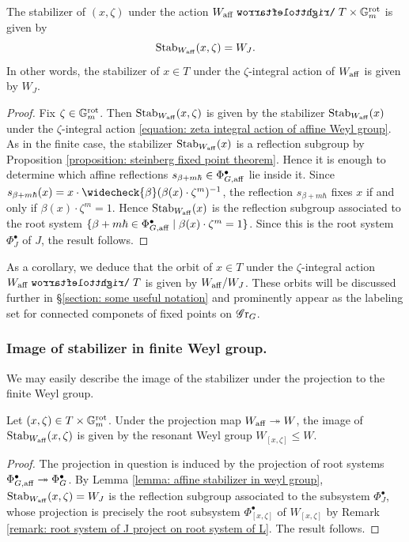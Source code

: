 \begin{lemma}\label{lemma: affine stabilizer in weyl group}
The stabilizer of $(x, \zeta)$ under the action $W_{\aff} \acts T \times \Gm^{\rot}$ is given by
\begin{equation*}
    \operatorname{Stab}_{W_{\mathrm{aff}}}(x, \zeta) = W_J.
\end{equation*}
In other words, the stabilizer of $x \in T$ under the $\zeta$-integral action of $W_{\mathrm{aff}}$ is given by $W_J$.
\end{lemma}
\begin{proof}
Fix $\zeta \in \mathbb{G}_m^{\mathrm{rot}}$. Then $\operatorname{Stab}_{W_{\mathrm{aff}}}(x, \zeta)$ is given by the stabilizer $\operatorname{Stab}_{W_{\mathrm{aff}}}(x)$ under the $\zeta$-integral action \eqref{equation: zeta integral action of affine Weyl group}. 
As in the finite case, the stabilizer $\operatorname{Stab}_{W_{\mathrm{aff}}}(x)$ is a reflection subgroup by Proposition \ref{proposition: steinberg fixed point theorem}. 
%
Hence it is enough to determine which affine reflections $s_{\beta + m\hbar} \in \Phi^{\bullet}_{G, \mathrm{aff}}$ lie inside it. Since $s_{\beta + m\hbar}(x) = x \cdot \widecheck{\beta}(\beta(x) \cdot \zeta^m)^{-1}$, the reflection $s_{\beta + m\hbar}$ fixes $x$ if and only if $\beta(x) \cdot \zeta^m =1$. Hence $\operatorname{Stab}_{W_{\mathrm{aff}}}(x)$ is the reflection subgroup associated to the root system $\{\beta + m\hbar \in \Phi^{\bullet}_{G, \mathrm{aff}} \mid \beta(x) \cdot \zeta^m =1 \}$. Since this is the root system $\Phi^{\bullet}_J$ of $J$, the result follows.
\end{proof}

As a corollary, we deduce that the orbit of $x \in T$ under the $\zeta$-integral action $W_{\aff} \acts T$ is given by $W_{\mathrm{aff}} / W_J$. These orbits will be discussed further in \S \ref{section: some useful notation} and prominently appear as the labeling set for connected componets of fixed points on $\operatorname{\mathscr{G}r}_G$.


\subsubsection{Image of stabilizer in finite Weyl group.}

We may easily describe the image of the stabilizer under the projection to the finite Weyl group.

\begin{lemma}
Let $(x, \zeta) \in T \times \mathbb{G}_m^{\mathrm{rot}}$.
Under the projection map $W_{\mathrm{aff}} \twoheadrightarrow W$, the image of $\operatorname{Stab}_{W_{\mathrm{aff}}}(x, \zeta)$ is given by the resonant Weyl group $W_{[x, \zeta]} \leq W$.
\end{lemma}
\begin{proof}
The projection in question is induced by the projection of root systems $\Phi^{\bullet}_{G, \mathrm{aff}} \twoheadrightarrow \Phi^{\bullet}_{G}$. By Lemma \ref{lemma: affine stabilizer in weyl group}, $\operatorname{Stab}_{W_{\mathrm{aff}}}(x, \zeta) = W_{J}$ is the reflection subgroup associated to the subsystem $\Phi^{\bullet}_J$, whose projection is precisely the root subsystem $\Phi^{\bullet}_{[x, \zeta]} $ of $W_{[x, \zeta]}$ by Remark \ref{remark: root system of J project on root system of L}. The result follows.
\end{proof}

